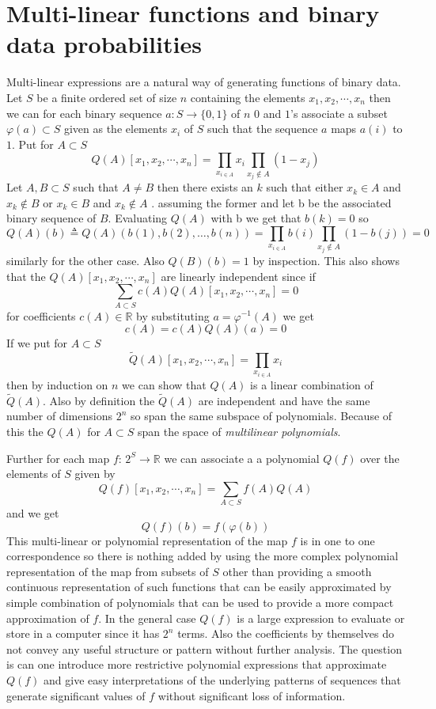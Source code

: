 \documentclass[a4paper,oneside,english]{book}
\numberwithin{equation}{section}
\numberwithin{figure}{section}
\begin{document}
\section{Multi-linear functions and binary data probabilities}

Multi-linear expressions are a natural way of generating functions of
binary data. Let $S$ be a finite ordered set of size $n$ containing
the elements $x_{1},x_{2},\cdots,x_{n}$ then we can for each binary
sequence $a:S\rightarrow\{0,1\}$ of $n$ $0$ and $1$'s associate
a subset $\varphi(a)\subset S$ given as the elements $x_{i}$ of
$S$ such that the sequence $a$ maps $a(i)$ to $1$. Put for $A\subset S$
\[
Q(A)[x_{1},x_{2},\cdots,x_{n}]=\prod_{x_{i\in A}}x_{i}\prod_{x_{j}\notin A}(1-x_{j})
\]
Let $A,B\subset S$ such that $A\neq B$ then there exists an $k$
such that either $x_{k}\in A$ and $x_{k}\notin B$ or $x_{k}\in B$
and $x_{k}\notin A$ . assuming the former and let b be the associated
binary sequence of $B$. Evaluating $Q(A)$ with b we get that $b(k)=0$
so 
\[
Q(A)(b)\triangleq Q(A)(b(1),b(2),\ldots,b(n))=\prod_{x_{i\in A}}b(i)\prod_{x_{j}\notin A}(1-b(j))=0
\]
similarly for the other case. Also $Q(B)(b)=1$ by inspection. This
also shows that the $Q(A)[x_{1},x_{2},\cdots,x_{n}]$ are linearly
independent since if
\[
\sum_{A\subset S}c(A)Q(A)[x_{1},x_{2},\cdots,x_{n}]=0
\]
for coefficients $c(A)\in\mathbb{R}$ by substituting $a=\varphi^{-1}(A)$
we get
\[
c(A)=c(A)Q(A)(a)=0
\]
If we put for $A\subset S$
\[
\widetilde{Q}(A)[x_{1},x_{2},\cdots,x_{n}]=\prod_{x_{i\in A}}x_{i}
\]
then by induction on $n$ we can show that $Q(A)$ is a linear combination
of $\widetilde{Q}(A)$. Also by definition the $\widetilde{Q}(A)$
are independent and have the same number of dimensions $2^{n}$ so
span the same subspace of polynomials. Because of this the $Q(A)$
for $A\subset S$ span the space of \emph{multilinear polynomials}.

Further for each map $f:\,2^{S}\rightarrow\mathbb{R}$ we can associate
a a polynomial $Q(f)$ over the elements of $S$ given by
\[
Q(f)[x_{1},x_{2},\cdots,x_{n}]=\sum_{A\subset S}f(A)Q(A)
\]
and we get 
\[
Q(f)(b)=f(\varphi(b))
\]
This multi-linear or polynomial representation of the map $f$ is
in one to one correspondence so there is nothing added by using the
more complex polynomial representation of the map from subsets of
$S$ other than providing a smooth continuous representation of such
functions that can be easily approximated by simple combination of
polynomials that can be used to provide a more compact approximation
of $f$. In the general case $Q(f)$ is a large expression to evaluate
or store in a computer since it has $2^{n}$ terms. Also the coefficients
by themselves do not convey any useful structure or pattern without
further analysis. The question is can one introduce more restrictive
polynomial expressions that approximate $Q(f)$ and give easy interpretations
of the underlying patterns of sequences that generate significant
values of $f$ without significant loss of information.
\end{document}
